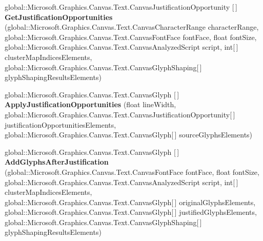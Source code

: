 \begin{DoxyCompactItemize}
\item 
\mbox{\label{class_microsoft_1_1_graphics_1_1_canvas_1_1_text_1_1_canvas_text_analyzer_ab8294f1044be5a3f03e8601c5a48811a}} 
global\+::\+Microsoft.\+Graphics.\+Canvas.\+Text.\+Canvas\+Justification\+Opportunity \mbox{[}$\,$\mbox{]} {\bfseries Get\+Justification\+Opportunities} (global\+::\+Microsoft.\+Graphics.\+Canvas.\+Text.\+Canvas\+Character\+Range character\+Range, global\+::\+Microsoft.\+Graphics.\+Canvas.\+Text.\+Canvas\+Font\+Face font\+Face, float font\+Size, global\+::\+Microsoft.\+Graphics.\+Canvas.\+Text.\+Canvas\+Analyzed\+Script script, int\mbox{[}$\,$\mbox{]} cluster\+Map\+Indices\+Elements, global\+::\+Microsoft.\+Graphics.\+Canvas.\+Text.\+Canvas\+Glyph\+Shaping\mbox{[}$\,$\mbox{]} glyph\+Shaping\+Results\+Elements)
\item 
\mbox{\label{class_microsoft_1_1_graphics_1_1_canvas_1_1_text_1_1_canvas_text_analyzer_a46e9ecbf797abc6031411602e6c4d80e}} 
global\+::\+Microsoft.\+Graphics.\+Canvas.\+Text.\+Canvas\+Glyph \mbox{[}$\,$\mbox{]} {\bfseries Apply\+Justification\+Opportunities} (float line\+Width, global\+::\+Microsoft.\+Graphics.\+Canvas.\+Text.\+Canvas\+Justification\+Opportunity\mbox{[}$\,$\mbox{]} justification\+Opportunities\+Elements, global\+::\+Microsoft.\+Graphics.\+Canvas.\+Text.\+Canvas\+Glyph\mbox{[}$\,$\mbox{]} source\+Glyphs\+Elements)
\item 
\mbox{\label{class_microsoft_1_1_graphics_1_1_canvas_1_1_text_1_1_canvas_text_analyzer_ac713992346afb6a64bca95d05ee3ac94}} 
global\+::\+Microsoft.\+Graphics.\+Canvas.\+Text.\+Canvas\+Glyph \mbox{[}$\,$\mbox{]} {\bfseries Add\+Glyphs\+After\+Justification} (global\+::\+Microsoft.\+Graphics.\+Canvas.\+Text.\+Canvas\+Font\+Face font\+Face, float font\+Size, global\+::\+Microsoft.\+Graphics.\+Canvas.\+Text.\+Canvas\+Analyzed\+Script script, int\mbox{[}$\,$\mbox{]} cluster\+Map\+Indices\+Elements, global\+::\+Microsoft.\+Graphics.\+Canvas.\+Text.\+Canvas\+Glyph\mbox{[}$\,$\mbox{]} original\+Glyphs\+Elements, global\+::\+Microsoft.\+Graphics.\+Canvas.\+Text.\+Canvas\+Glyph\mbox{[}$\,$\mbox{]} justified\+Glyphs\+Elements, global\+::\+Microsoft.\+Graphics.\+Canvas.\+Text.\+Canvas\+Glyph\+Shaping\mbox{[}$\,$\mbox{]} glyph\+Shaping\+Results\+Elements)

\end{DoxyCompactItemize}
